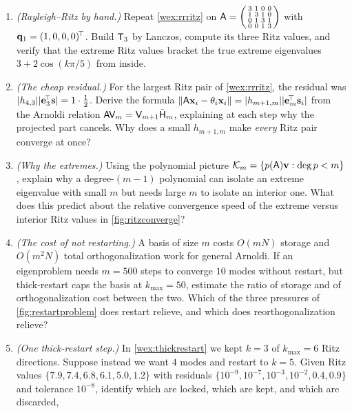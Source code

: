 \exercisessection
\begin{enumerate}[nosep]
  \item \emph{(Rayleigh--Ritz by hand.)} Repeat \cref{wex:rrritz} on
  $\mathsf{A} = \begin{psmallmatrix} 3 & 1 & 0 & 0\\ 1 & 3 & 1 & 0\\ 0 & 1 & 3 & 1\\ 0 & 0 & 1 & 3
  \end{psmallmatrix}$ with $\mathbf{q}_1 = (1,0,0,0)^{\!\top}$. Build $\mathsf{T}_3$ by Lanczos, compute its
  three Ritz values, and verify that the extreme Ritz values bracket the true extreme eigenvalues
  $3 + 2\cos(k\pi/5)$ from inside.
  \item \emph{(The cheap residual.)} For the largest Ritz pair of \cref{wex:rrritz}, the residual
  was $\lvert h_{4,3}\rvert\lvert\mathbf{e}_3^{\!\top}\mathbf{s}\rvert = 1\cdot\tfrac12$. Derive the formula
  $\lVert\mathsf{A}\mathbf{x}_i - \theta_i\mathbf{x}_i\rVert = \lvert h_{m+1,m}\rvert\lvert\mathbf{e}_m^{\!\top}\mathbf{s}_i\rvert$ from the Arnoldi
  relation $\mathsf{A}\mathsf{V}_m = \mathsf{V}_{m+1}\bar{\mathsf{H}}_m$, explaining at each step why the
  projected part cancels. Why does a small $h_{m+1,m}$ make \emph{every} Ritz pair converge at once?
  \item \emph{(Why the extremes.)} Using the polynomial picture $\mathcal{K}_m = \{p(\mathsf{A})\mathbf{v} :
  \deg p < m\}$, explain why a degree-$(m{-}1)$ polynomial can isolate an extreme eigenvalue with
  small $m$ but needs large $m$ to isolate an interior one. What does this predict about the relative
  convergence speed of the extreme versus interior Ritz values in \cref{fig:ritzconverge}?
  \item \emph{(The cost of not restarting.)} A basis of size $m$ costs $O(mN)$ storage and
  $O(m^2 N)$ total orthogonalization work for general Arnoldi. If an eigenproblem needs $m = 500$
  steps to converge $10$ modes without restart, but thick-restart caps the basis at $k_{\max} = 50$,
  estimate the ratio of storage and of orthogonalization cost between the two. Which of the three
  pressures of \cref{fig:restartproblem} does restart relieve, and which does reorthogonalization
  relieve?
  \item \emph{(One thick-restart step.)} In \cref{wex:thickrestart} we kept $k = 3$ of $k_{\max} = 6$
  Ritz directions. Suppose instead we want $4$ modes and restart to $k = 5$. Given Ritz values
  $\{7.9, 7.4, 6.8, 6.1, 5.0, 1.2\}$ with residuals $\{10^{-9}, 10^{-7}, 10^{-3}, 10^{-2}, 0.4,
  0.9\}$ and tolerance $10^{-8}$, identify which are locked, which are kept, and which are discarded,

\end{enumerate}
